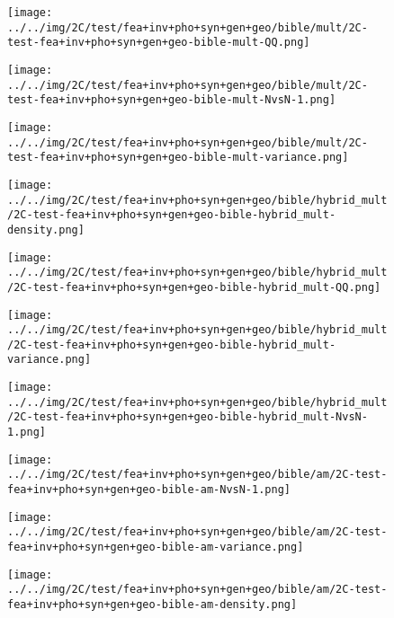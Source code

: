 \begin{figure}[H]
\centering	\texttt{[image: ../../img/2C/test/fea+inv+pho+syn+gen+geo/bible/mult/2C-test-fea+inv+pho+syn+gen+geo-bible-mult-QQ.png]}
\end{figure}
\begin{figure}[H]
\centering	\texttt{[image: ../../img/2C/test/fea+inv+pho+syn+gen+geo/bible/mult/2C-test-fea+inv+pho+syn+gen+geo-bible-mult-NvsN-1.png]}
\end{figure}
\begin{figure}[H]
\centering	\texttt{[image: ../../img/2C/test/fea+inv+pho+syn+gen+geo/bible/mult/2C-test-fea+inv+pho+syn+gen+geo-bible-mult-variance.png]}
\end{figure}
\begin{figure}[H]
\centering	\texttt{[image: ../../img/2C/test/fea+inv+pho+syn+gen+geo/bible/hybrid\_mult/2C-test-fea+inv+pho+syn+gen+geo-bible-hybrid\_mult-density.png]}
\end{figure}
\begin{figure}[H]
\centering	\texttt{[image: ../../img/2C/test/fea+inv+pho+syn+gen+geo/bible/hybrid\_mult/2C-test-fea+inv+pho+syn+gen+geo-bible-hybrid\_mult-QQ.png]}
\end{figure}
\begin{figure}[H]
\centering	\texttt{[image: ../../img/2C/test/fea+inv+pho+syn+gen+geo/bible/hybrid\_mult/2C-test-fea+inv+pho+syn+gen+geo-bible-hybrid\_mult-variance.png]}
\end{figure}
\begin{figure}[H]
\centering	\texttt{[image: ../../img/2C/test/fea+inv+pho+syn+gen+geo/bible/hybrid\_mult/2C-test-fea+inv+pho+syn+gen+geo-bible-hybrid\_mult-NvsN-1.png]}
\end{figure}
\begin{figure}[H]
\centering	\texttt{[image: ../../img/2C/test/fea+inv+pho+syn+gen+geo/bible/am/2C-test-fea+inv+pho+syn+gen+geo-bible-am-NvsN-1.png]}
\end{figure}
\begin{figure}[H]
\centering	\texttt{[image: ../../img/2C/test/fea+inv+pho+syn+gen+geo/bible/am/2C-test-fea+inv+pho+syn+gen+geo-bible-am-variance.png]}
\end{figure}
\begin{figure}[H]
\centering	\texttt{[image: ../../img/2C/test/fea+inv+pho+syn+gen+geo/bible/am/2C-test-fea+inv+pho+syn+gen+geo-bible-am-density.png]}
\end{figure}
